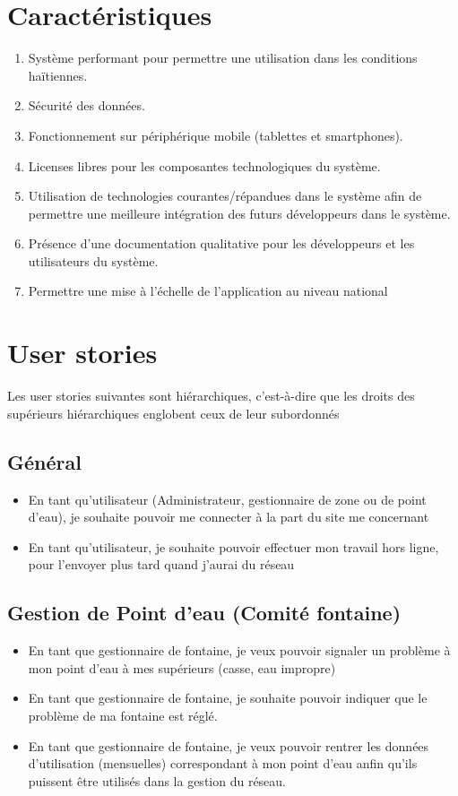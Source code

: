 \documentclass[a4paper, 11pt]{article}
\begin{document}
\section{Caractéristiques}
\begin{enumerate}
  \item Système performant pour permettre une utilisation dans les conditions haïtiennes.
  \item Sécurité des données.
  \item Fonctionnement sur périphérique mobile (tablettes et smartphones).
  \item Licenses libres pour les composantes technologiques du système.
  \item Utilisation de technologies courantes/répandues dans le système afin de permettre une meilleure intégration des futurs développeurs dans le système.
  \item Présence d'une documentation qualitative pour les développeurs et les utilisateurs du système.
  \item Permettre une mise à l'échelle de l'application au niveau national
\end{enumerate}

\section{User stories}
Les user stories suivantes sont hiérarchiques, c'est-à-dire que les droits des supérieurs hiérarchiques englobent ceux de leur subordonnés
\subsection{Général}
\begin{itemize}
  \item En tant qu'utilisateur (Administrateur, gestionnaire de zone ou de point d'eau), je souhaite pouvoir me connecter à la part du site me concernant
  \item En tant qu'utilisateur, je souhaite pouvoir effectuer mon travail hors ligne, pour l'envoyer plus tard quand j'aurai du réseau
\end{itemize}

\subsection{Gestion de Point d'eau (Comité fontaine)}
\begin{itemize}
  \item En tant que gestionnaire de fontaine, je veux pouvoir signaler un problème à mon point d'eau à mes supérieurs (casse, eau impropre)
  \item En tant que gestionnaire de fontaine, je souhaite pouvoir indiquer que le problème de ma fontaine est réglé.
  \item En tant que gestionnaire de fontaine, je veux pouvoir rentrer les données d'utilisation (mensuelles) correspondant à mon point d'eau anfin qu'ils puissent être utilisés dans la gestion du réseau.
\end{itemize}
\end{document}
